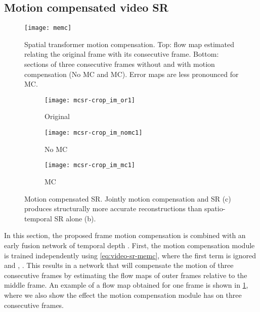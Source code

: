 \documentclass[10pt,twocolumn,letterpaper]{article}
\begin{document}
\subsection{Motion compensated video SR}

\begin{figure}
	\centering
    \texttt{[image: memc]}
    \caption{Spatial transformer motion compensation. Top: flow map estimated relating the original frame with its consecutive frame. Bottom: sections of three consecutive frames without and with motion compensation (No MC and MC). Error maps are less pronounced for MC.}
    \label{fig:memc}
\end{figure}

\begin{figure}
  \centering
  \begin{subfigure}[b]{0.32\columnwidth}
      \centering
      \texttt{[image: mcsr-crop\_im\_or1]}
      \caption{Original}
      \label{fig:mcsr-original}
  \end{subfigure}
  \begin{subfigure}[b]{0.32\columnwidth}
      \centering
      \texttt{[image: mcsr-crop\_im\_nomc1]}
      \caption{No MC }
      \label{fig:mcsr-no-mc}
  \end{subfigure}
  \begin{subfigure}[b]{0.32\columnwidth}
      \centering
      \texttt{[image: mcsr-crop\_im\_mc1]}
      \caption{MC }
      \label{fig:mcsr-no}
  \end{subfigure}
  \caption{Motion compensated  \gls{SR}. Jointly motion compensation and \gls{SR} (c) produces structurally more accurate reconstructions than spatio-temporal \gls{SR} alone (b).}
  \label{fig:mcsr-x3}
\end{figure}

In this section, the proposed frame motion compensation is combined with an early fusion network of temporal depth . First, the motion compensation module is trained independently using \cref{eq:video-sr-memc}, where the first term is ignored and , . This results in a network that will compensate the motion of three consecutive frames by estimating the flow maps of outer frames relative to the middle frame. An example of a flow map obtained for one frame is shown in \cref{fig:memc}, where we also show the effect the motion compensation module has on three consecutive frames.
\end{document}

